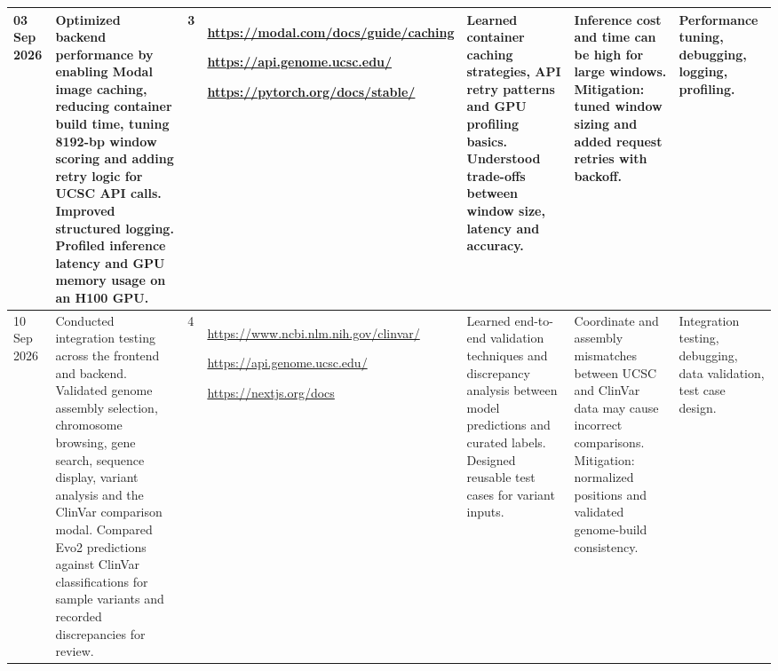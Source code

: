 \documentclass[8pt,a4paper]{article}
\begin{document}
\begin{longtable}{|
    D{1.25cm}|
    D{4.10cm}|
    D{0.70cm}|
    D{2.90cm}|
    D{2.90cm}|
    D{3.00cm}|
    D{2.95cm}|
}
03 Sep 2026 &
Optimized backend performance by enabling Modal image caching, reducing container build time, tuning 8192-bp window scoring and adding retry logic for UCSC API calls. Improved structured logging. Profiled inference latency and GPU memory usage on an H100 GPU. &
3 &
\url{https://modal.com/docs/guide/caching}
\par
\url{https://api.genome.ucsc.edu/}
\par
\url{https://pytorch.org/docs/stable/}
&
Learned container caching strategies, API retry patterns and GPU profiling basics. Understood trade-offs between window size, latency and accuracy. &
Inference cost and time can be high for large windows. Mitigation: tuned window sizing and added request retries with backoff. &
Performance tuning, debugging, logging, profiling. \\
\hline

10 Sep 2026 &
Conducted integration testing across the frontend and backend. Validated genome assembly selection, chromosome browsing, gene search, sequence display, variant analysis and the ClinVar comparison modal. Compared Evo2 predictions against ClinVar classifications for sample variants and recorded discrepancies for review. &
4 &
\url{https://www.ncbi.nlm.nih.gov/clinvar/}
\par
\url{https://api.genome.ucsc.edu/}
\par
\url{https://nextjs.org/docs}
&
Learned end-to-end validation techniques and discrepancy analysis between model predictions and curated labels. Designed reusable test cases for variant inputs. &
Coordinate and assembly mismatches between UCSC and ClinVar data may cause incorrect comparisons. Mitigation: normalized positions and validated genome-build consistency. &
Integration testing, debugging, data validation, test case design. \\
\hline


\end{longtable}
\end{document}

